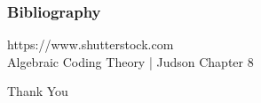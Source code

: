\documentclass{beamer}
\begin{document}

\begin{frame}
\frametitle{Bibliography}
\centering
https://www.shutterstock.com \\
Algebraic Coding Theory | Judson Chapter 8
    
\end{frame}

\begin{frame}
    \begin{center}
        {\Huge Thank You}
    \end{center}
\end{frame}
\end{document}
